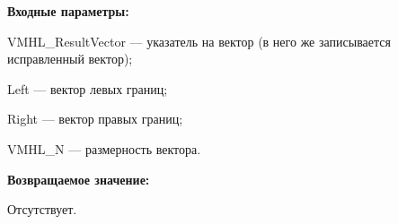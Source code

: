 \textbf{Входные параметры:}  
 
VMHL\_ResultVector --- указатель на вектор (в него же записывается исправленный вектор);
 
Left --- вектор левых границ;
 
Right --- вектор правых границ;
 
VMHL\_N --- размерность вектора.

\textbf{Возвращаемое значение:}

Отсутствует.